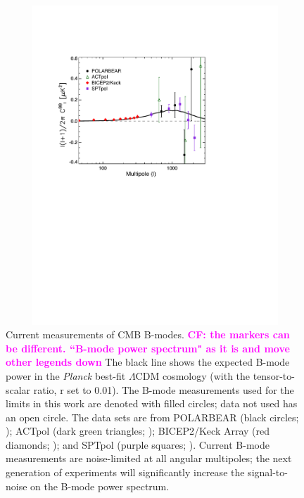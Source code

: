 \documentclass[apj]{emulateapj}
\newcommand{\lcdm}{\ensuremath{\Lambda}CDM}
\newcommand{\planck}{{\sl Planck}}
\begin{document}
\begin{figure}[htb]\centering
\includegraphics[width=13cm,height=12cm]{pmf_experiments.pdf}
  \caption[Current measurements of CMB B-modes]{
  Current measurements of CMB B-modes. \textbf{\textcolor{magenta}{CF: the markers can be different. ``B-mode power spectrum" as it is and move other legends down}}
    The black line shows the expected B-mode power in the \planck{} best-fit \lcdm{} cosmology (with the tensor-to-scalar ratio, r set to 0.01). 
    The B-mode measurements used for the limits in this work are denoted with filled circles; data not used has an open circle. 
  The data sets are from POLARBEAR (black circles; \citet{polarbear14b}); ACTpol (dark green triangles; \citet{naess14});  BICEP2/Keck Array (red diamonds; \citet{bicepkeck15}); and SPTpol (purple squares; \citet{keisler15}). 
      Current B-mode measurements are noise-limited at all angular multipoles; the next generation of experiments will significantly increase the signal-to-noise on the B-mode power spectrum. 
           \label{fig:pmf-experiments}
  }
\end{figure}
\end{document}
